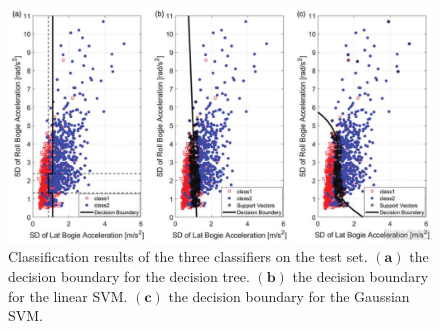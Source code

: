 \begin{figure}[H]
    \centering
    \includegraphics[width=12cm]{Cap2_LitReview/Track_Quality_Accel/DeRosa (2021)/Results.png}
    \caption{Classification results of the three classifiers on the test set. $\boldsymbol{(a)}$ the decision boundary for the decision tree. $\boldsymbol{(b)}$ the decision boundary for the linear SVM. $\boldsymbol{(c)}$ the decision boundary for the Gaussian SVM. \cite{DeRosa2021}}
    \label{fig:DeRosa-2021-Results}
\end{figure}



